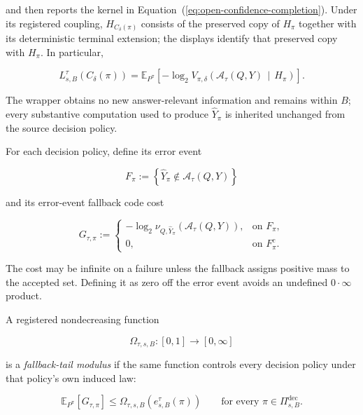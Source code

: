 \documentclass[10pt]{article} %
\renewcommand{\eqref}[1]{\textup{(\ref{#1})}}
\providecommand{\1}{\mathbf{1}}  %
\theoremstyle{remark}
\theoremstyle{definition}
\begin{document}
and then reports the kernel in Equation~\eqref{eq:open-confidence-completion}. Under its registered coupling, $H_{C_\delta(\pi)}$ consists of the preserved copy of $H_\pi$ together with its deterministic terminal extension; the displays identify that preserved copy with $H_\pi$. In particular,

\begin{equation}
L_{s,B}^{\tau}\!\left(C_\delta(\pi)\right)
=
\mathbb E_{P^\pi}\!\left[
-\log_2
V_{\pi,\delta}\!\left(
\mathcal A_\tau(Q,Y)
\,\middle|\,
H_\pi
\right)
\right].
\end{equation}

The wrapper obtains no new answer-relevant information and remains within $B$; every substantive computation used to produce $\widehat Y_\pi$ is inherited unchanged from the source decision policy.

For each decision policy, define its error event

\begin{equation}
F_\pi
:=
\left\{
\widehat Y_\pi
\notin
\mathcal A_\tau(Q,Y)
\right\}
\label{eq:completion-error-event}
\end{equation}

and its error-event fallback code cost

\begin{equation}
G_{\tau,\pi}
:=
\begin{cases}
-\log_2
\nu_{Q,\widehat Y_\pi}\!\left(
\mathcal A_\tau(Q,Y)
\right),
&\text{on }F_\pi,
\\[3pt]
0,
&\text{on }F_\pi^c.
\end{cases}
\label{eq:fallback-code-length}
\end{equation}

The cost may be infinite on a failure unless the fallback assigns positive mass to the accepted set. Defining it as zero off the error event avoids an undefined $0\cdot\infty$ product.

A registered nondecreasing function

\begin{equation}
\Omega_{\tau,s,B}:[0,1]\longrightarrow[0,\infty]
\end{equation}

is a \emph{fallback-tail modulus} if the same function controls every decision policy under that policy's own induced law:

\begin{equation}
\mathbb E_{P^\pi}\!\left[
G_{\tau,\pi}
\right]
\leq
\Omega_{\tau,s,B}\!\left(
e_{s,B}^{\tau}(\pi)
\right)
\qquad
\text{for every }
\pi\in\Pi_{s,B}^{\mathrm{dec}}.
\label{eq:fallback-tail-modulus}
\end{equation}
\end{document}
